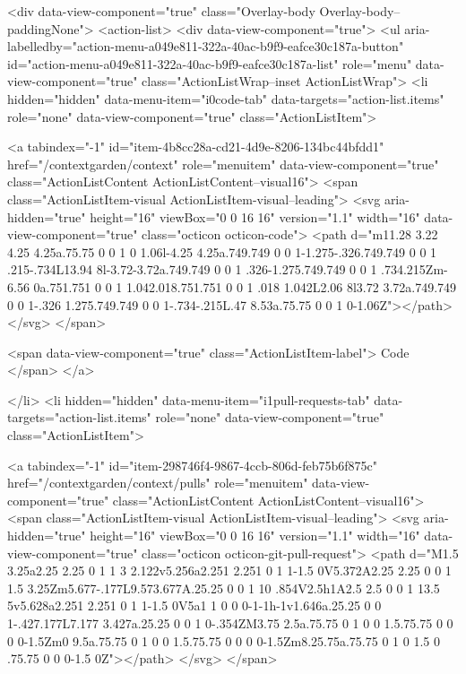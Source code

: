       <div data-view-component="true" class="Overlay-body Overlay-body--paddingNone">          <action-list>
  <div data-view-component="true">
    <ul aria-labelledby="action-menu-a049e811-322a-40ac-b9f9-eafce30c187a-button" id="action-menu-a049e811-322a-40ac-b9f9-eafce30c187a-list" role="menu" data-view-component="true" class="ActionListWrap--inset ActionListWrap">
        <li hidden="hidden" data-menu-item="i0code-tab" data-targets="action-list.items" role="none" data-view-component="true" class="ActionListItem">
    
    
    <a tabindex="-1" id="item-4b8cc28a-cd21-4d9e-8206-134bc44bfdd1" href="/contextgarden/context" role="menuitem" data-view-component="true" class="ActionListContent ActionListContent--visual16">
        <span class="ActionListItem-visual ActionListItem-visual--leading">
          <svg aria-hidden="true" height="16" viewBox="0 0 16 16" version="1.1" width="16" data-view-component="true" class="octicon octicon-code">
    <path d="m11.28 3.22 4.25 4.25a.75.75 0 0 1 0 1.06l-4.25 4.25a.749.749 0 0 1-1.275-.326.749.749 0 0 1 .215-.734L13.94 8l-3.72-3.72a.749.749 0 0 1 .326-1.275.749.749 0 0 1 .734.215Zm-6.56 0a.751.751 0 0 1 1.042.018.751.751 0 0 1 .018 1.042L2.06 8l3.72 3.72a.749.749 0 0 1-.326 1.275.749.749 0 0 1-.734-.215L.47 8.53a.75.75 0 0 1 0-1.06Z"></path>
</svg>
        </span>
      
        <span data-view-component="true" class="ActionListItem-label">
          Code
</span>      
</a>
  
</li>
        <li hidden="hidden" data-menu-item="i1pull-requests-tab" data-targets="action-list.items" role="none" data-view-component="true" class="ActionListItem">
    
    
    <a tabindex="-1" id="item-298746f4-9867-4ccb-806d-feb75b6f875c" href="/contextgarden/context/pulls" role="menuitem" data-view-component="true" class="ActionListContent ActionListContent--visual16">
        <span class="ActionListItem-visual ActionListItem-visual--leading">
          <svg aria-hidden="true" height="16" viewBox="0 0 16 16" version="1.1" width="16" data-view-component="true" class="octicon octicon-git-pull-request">
    <path d="M1.5 3.25a2.25 2.25 0 1 1 3 2.122v5.256a2.251 2.251 0 1 1-1.5 0V5.372A2.25 2.25 0 0 1 1.5 3.25Zm5.677-.177L9.573.677A.25.25 0 0 1 10 .854V2.5h1A2.5 2.5 0 0 1 13.5 5v5.628a2.251 2.251 0 1 1-1.5 0V5a1 1 0 0 0-1-1h-1v1.646a.25.25 0 0 1-.427.177L7.177 3.427a.25.25 0 0 1 0-.354ZM3.75 2.5a.75.75 0 1 0 0 1.5.75.75 0 0 0 0-1.5Zm0 9.5a.75.75 0 1 0 0 1.5.75.75 0 0 0 0-1.5Zm8.25.75a.75.75 0 1 0 1.5 0 .75.75 0 0 0-1.5 0Z"></path>
</svg>
        </span>
      
